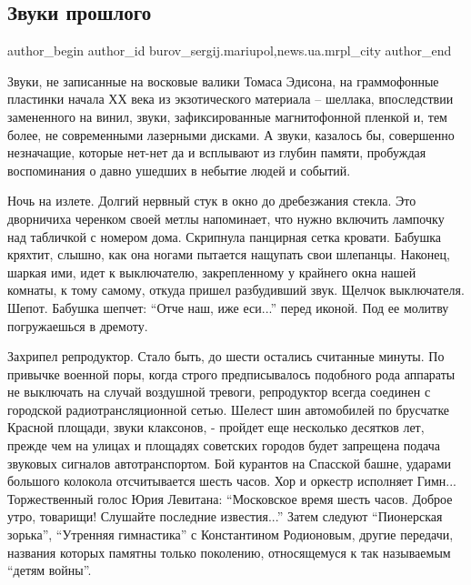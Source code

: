  
 
 
 
 
 
\subsection{Звуки прошлого}
\label{sec:03_02_2018.stz.news.ua.mrpl_city.1.zvuki_proshlogo}
 
\ifcmt
 author_begin
   author_id burov_sergij.mariupol,news.ua.mrpl_city
 author_end
\fi

Звуки, не записанные на восковые валики Томаса Эдисона, на граммофонные
пластинки начала ХХ века из экзотического материала – шеллака, впоследствии
замененного на винил, звуки, зафиксированные магнитофонной пленкой и, тем
более, не современными лазерными дисками. А звуки, казалось бы, совершенно
незначащие, которые нет-нет да и всплывают из глубин памяти, пробуждая
воспоминания о давно ушедших в небытие людей и событий.


Ночь на излете. Долгий нервный стук в окно до дребезжания стекла. Это
дворничиха черенком своей метлы напоминает, что нужно включить лампочку над
табличкой с номером дома. Скрипнула панцирная сетка кровати. Бабушка кряхтит,
слышно, как она ногами пытается нащупать свои шлепанцы. Наконец, шаркая ими,
идет к выключателю, закрепленному у крайнего окна нашей комнаты, к тому самому,
откуда пришел разбудивший звук. Щелчок выключателя. Шепот. Бабушка шепчет:
\enquote{Отче наш, иже еси...} перед иконой. Под ее молитву погружаешься в
дремоту.

Захрипел репродуктор. Стало быть, до шести остались считанные минуты. По
привычке военной поры, когда строго предписывалось подобного рода аппараты не
выключать на случай воздушной тревоги, репродуктор всегда соединен с городской
радиотрансляционной сетью. Шелест шин автомобилей по брусчатке Красной площади,
звуки клаксонов, - пройдет  еще несколько десятков лет, прежде чем на улицах  и
площадях советских городов будет запрещена подача звуковых сигналов
автотранспортом. Бой курантов на Спасской башне, ударами большого колокола
отсчитывается шесть часов. Хор и оркестр исполняет Гимн...  Торжественный голос
Юрия Левитана: \enquote{Московское время шесть часов. Доброе утро, товарищи!
Слушайте последние известия...} Затем следуют \enquote{Пионерская зорька},
\enquote{Утренняя гимнастика} с Константином Родионовым, другие передачи,
названия которых памятны только поколению, относящемуся к так называемым
\enquote{детям войны}.

